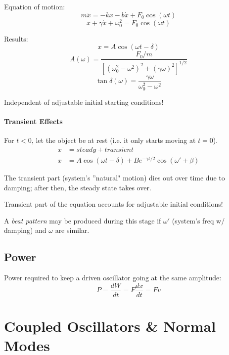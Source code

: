 \documentclass[11pt,letterpaper,titlepage,oneside]{book}
\begin{document}
Equation of motion:
\[ m\ddot{x} = -kx - b\dot{x} + F_0 \cos(\omega t) \]
\[ \ddot{x} + \gamma\dot{x} + \omega_0^2 = F_0 \cos(\omega t) \]

Results: 
\[ x = A \cos (\omega t - \delta) \]
\[ A(\omega) = \frac{F_0/m}{[(\omega_0^2 - \omega^2)^2 + (\gamma\omega)^2]^{1/2}} \]
\[ \tan \delta (\omega) = \frac{\gamma\omega}{\omega_0^2 - \omega^2}\]

Independent of adjustable initial starting conditions!

\subsubsection{Transient Effects}
For $t<0$, let the object be at rest (i.e. it only starts moving at $t=0$).
\begin{align*}
x &= steady + transient \\
x &= A \cos (\omega t - \delta) + B e^{-\gamma t/2} \cos(\omega' + \beta)
\end{align*}

The transient part (system's ''natural" motion) dies out over time due to damping; after then, the steady state takes over. 

Transient part of the equation accounts for adjustable initial conditions!

A \emph{beat pattern} may be produced during this stage if $\omega'$ (system's freq w/ damping) and $\omega$ are similar.

\section{Power}
Power required to keep a driven oscillator going at the same amplitude:
\[ P = \frac{dW}{dt} = F\frac{dx}{dt} = Fv \]

\chapter{Coupled Oscillators \& Normal Modes}
\end{document}
